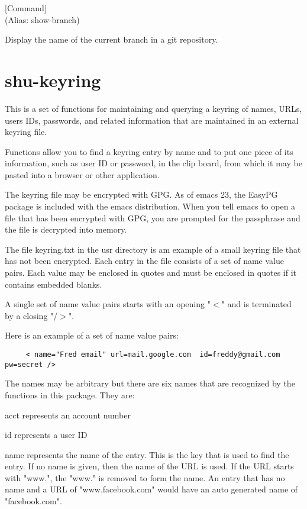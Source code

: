 \vspace{1em}
\noindent
{}
\usebox{\funcname}
 \hfill [Command]\\%
 (Alias: show-branch)

\begin{doc-string}
Display the name of the current branch in a git repository.
\end{doc-string}

\eject
\section{shu-keyring}


This is a set of functions for maintaining and querying a keyring of names,
URLs, users IDs, passwords, and related information that are maintained in an
external keyring file.

Functions allow you to find a keyring entry by name and to put one piece of
its information, such as user ID or password, in the clip board, from which it
may be pasted into a browser or other application.

The keyring file may be encrypted with GPG.  As of emacs 23, the EasyPG
package is included with the emacs distribution.  When you tell emacs to open
a file that has been encrypted with GPG, you are prompted for the passphrase
and the file is decrypted into memory.

The file keyring.txt in the usr directory is am example of a small
keyring file that has not been encrypted.  Each entry in the file consists of
a set of name value pairs.  Each value may be enclosed in quotes and must be
enclosed in quotes if it contains embedded blanks.

A single set of name value pairs starts with an opening "$<$" and is terminated
by a closing "/$>$".

Here is an example of a set of name value pairs:

\small{\begin{verbatim}
     < name="Fred email" url=mail.google.com  id=freddy@gmail.com  pw=secret />
\end{verbatim}}

The names may be arbitrary but there are six names that are recognized by the
functions in this package.  They are:

acct represents an account number

id represents a user ID

name represents the name of the entry.  This is the key that is used to find
the entry.  If no name is given, then the name of the URL is used.  If the URL
starts with "www.", the "www." is removed to form the name.  An entry that has
no name and a URL of "www.facebook.com" would have an auto generated name of
"facebook.com".

